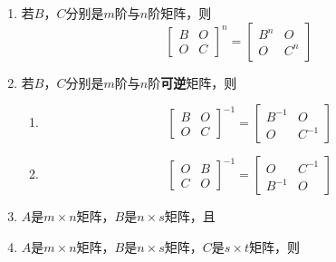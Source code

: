 \documentclass[a4paper,12pt]{article}
\begin{document}
    \begin{enumerate}
        \item 若$B$，$C$分别是$m$阶与$n$阶矩阵，则
        \[
            \begin{bmatrix}
                B & O \\
                O & C
            \end{bmatrix}^n
            = \begin{bmatrix}
                  B^n & O   \\
                  O   & C^n
            \end{bmatrix}
        \]
        \item 若$B$，$C$分别是$m$阶与$n$阶\textbf{可逆}矩阵，则
        \begin{enumerate}
            \item
            \[
                \begin{bmatrix}
                    B & O \\
                    O & C
                \end{bmatrix}^{-1}
                = \begin{bmatrix}
                      B^{-1} & O      \\
                      O      & C^{-1}
                \end{bmatrix}
            \]
            \item
            \[
                \begin{bmatrix}
                    O & B \\
                    C & O
                \end{bmatrix}^{-1}
                = \begin{bmatrix}
                      O      & C^{-1} \\
                      B^{-1} & O
                \end{bmatrix}
            \]
        \end{enumerate}
        \item $A$是$m \times n$矩阵，$B$是$n \times s$矩阵，且
        \item $A$是$m \times n$矩阵，$B$是$n \times s$矩阵，$C$是$s \times t$矩阵，则
    \end{enumerate}
\end{document}

